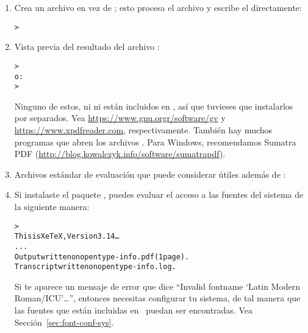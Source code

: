 \documentclass{article}
\begin{document}
\begin{enumerate}
\item Crea un archivo  en vez de \dvi{}; esto procesa el
	archivo  y escribe el  directamente:
\begin{alltt}
> 
\end{alltt}

\item Vista previa del resultado del archivo :
\begin{alltt}
> 
\textrm{o:}
> 
\end{alltt}
Ninguno de estos, ni  ni  están incluidos en
\TL{}, así que tuvieses que instalarlos por separados. Vea
\url{https://www.gnu.orgr/software/gv} y
\url{https://www.xpdfreader.com}, respectivamente. También hay
muchos programas que abren los archivos . Para Windows,
recomendamos Sumatra PDF
(\url{http://blog.kowalczyk.info/software/sumatrapdf}).

\item Archivos estándar de evaluación que puede considerar útiles
	además de :

\item Si instalaste el paquete , puedes evaluar el
	acceso a las fuentes del sistema de la siguiente manera:
\begin{alltt}
> 
This is XeTeX, Version 3.14\ldots
...
Output written on opentype-info.pdf (1 page).
Transcript written on opentype-info.log.
\end{alltt}

Si te aparece un mensaje de error que dice ``Invalid fontname `Latin
Modern Roman/ICU'\ldots'', entonces necesitas configurar tu sistema,
de tal manera que las fuentes que están incluidas en \TL\ puedan ser
encontradas. Vea 
Sección~\ref{sec:font-conf-sys}.

\end{enumerate}
\end{document}
